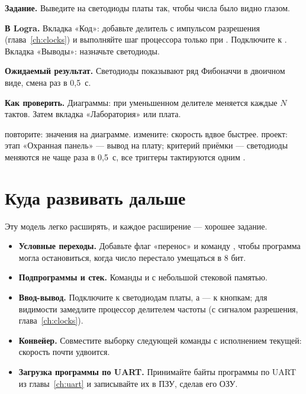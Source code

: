 \begin{diybox}
\textbf{Задание.} Выведите  на светодиоды платы так, чтобы числа было видно глазом.

\textbf{В Logra.} Вкладка «Код»: добавьте делитель с импульсом разрешения  (глава~\ref{ch:clocks}) и выполняйте шаг процессора только при . Подключите  к . Вкладка «Выводы»: назначьте светодиоды.

\textbf{Ожидаемый результат.} Светодиоды показывают ряд Фибоначчи в двоичном виде, смена раз в 0,5~с.

\textbf{Как проверить.} Диаграммы: при уменьшенном делителе  меняется каждые $N$ тактов. Затем вкладка «Лаборатория» или плата.

 повторите: значения  на диаграмме.  измените: скорость вдвое быстрее.  проект: этап «Охранная панель» --- вывод на плату; критерий приёмки --- светодиоды меняются не чаще раза в 0,5~с, все триггеры тактируются одним .
\end{diybox}

\section{Куда развивать дальше}

Эту модель легко расширять, и каждое расширение --- хорошее задание.

\begin{itemize}
  \item \textbf{Условные переходы.} Добавьте флаг «перенос» и команду ,
        чтобы программа могла остановиться, когда число перестало
        умещаться в 8 бит.
  \item \textbf{Подпрограммы и стек.} Команды  и  с
        небольшой стековой памятью.
  \item \textbf{Ввод-вывод.} Подключите  к светодиодам платы, а
         --- к кнопкам; для видимости замедлите процессор делителем
        частоты (с сигналом разрешения, глава~\ref{ch:clocks}).
  \item \textbf{Конвейер.} Совместите выборку следующей команды с исполнением
        текущей: скорость почти удвоится.
  \item \textbf{Загрузка программы по UART.} Принимайте байты программы по
        UART из главы~\ref{ch:uart} и записывайте их в ПЗУ, сделав его ОЗУ.
\end{itemize}

